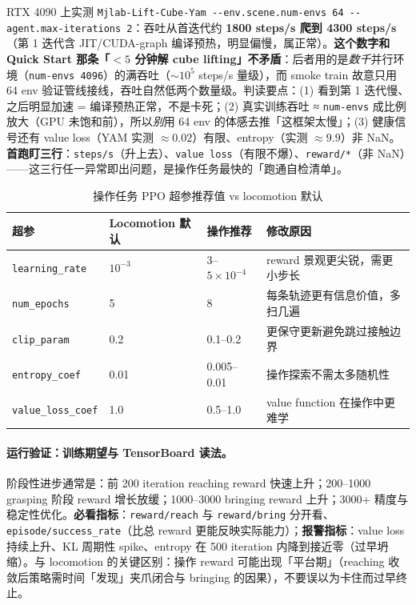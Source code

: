\begin{note}
RTX 4090 上实测 \verb|Mjlab-Lift-Cube-Yam --env.scene.num-envs 64 --agent.max-iterations 2|：吞吐从首迭代约 \textbf{1800 steps/s 爬到 4300 steps/s}（第 1 迭代含 JIT/CUDA-graph 编译预热，明显偏慢，属正常）。\textbf{这个数字和 Quick Start 那条「$<5$ 分钟解 cube lifting」不矛盾}：后者用的是\emph{数千}并行环境（\verb|num-envs 4096|）的满吞吐（$\sim10^5$ steps/s 量级），而 smoke train 故意只用 64 env 验证管线接线，吞吐自然低两个数量级。判读要点：(1) 看到第 1 迭代慢、之后明显加速 = 编译预热正常，不是卡死；(2) 真实训练吞吐 ≈ \verb|num-envs| 成比例放大（GPU 未饱和前），所以\emph{别}用 64 env 的体感去推「这框架太慢」；(3) 健康信号还有 value loss（YAM 实测 $\approx0.02$）有限、entropy（实测 $\approx9.9$）非 NaN。\textbf{首跑盯三行}：\verb|steps/s|（升上去）、\verb|value loss|（有限不爆）、\verb|reward/*|（非 NaN）——这三行任一异常即出问题，是操作任务最快的「跑通自检清单」。
\end{note}

\begin{table}[ht]
\centering
\small
\caption{操作任务 PPO 超参推荐值 vs locomotion 默认}
\label{tab:rlmc-manip-ppohp}
\begin{tabular}{@{}llll@{}}
\toprule
超参 & Locomotion 默认 & 操作推荐 & 修改原因 \\
\midrule
\verb|learning_rate| & $10^{-3}$ & $3$--$5\times10^{-4}$ & reward 景观更尖锐，需更小步长 \\
\verb|num_epochs| & 5 & 8 & 每条轨迹更有信息价值，多扫几遍 \\
\verb|clip_param| & 0.2 & 0.1--0.2 & 更保守更新避免跳过接触边界 \\
\verb|entropy_coef| & 0.01 & 0.005--0.01 & 操作探索不需太多随机性 \\
\verb|value_loss_coef| & 1.0 & 0.5--1.0 & value function 在操作中更难学 \\
\bottomrule
\end{tabular}
\end{table}

\paragraph{运行验证：训练期望与 TensorBoard 读法。}阶段性进步通常是：前 200 iteration reaching reward 快速上升；200--1000 grasping 阶段 reward 增长放缓；1000--3000 bringing reward 上升；3000+ 精度与稳定性优化。\textbf{必看指标}：\verb|reward/reach| 与 \verb|reward/bring| 分开看、\verb|episode/success_rate|（比总 reward 更能反映实际能力）；\textbf{报警指标}：value loss 持续上升、KL 周期性 spike、entropy 在 500 iteration 内降到接近零（过早坍缩）。与 locomotion 的关键区别：操作 reward 可能出现「平台期」（reaching 收敛后策略需时间「发现」夹爪闭合与 bringing 的因果），不要误以为卡住而过早终止。

